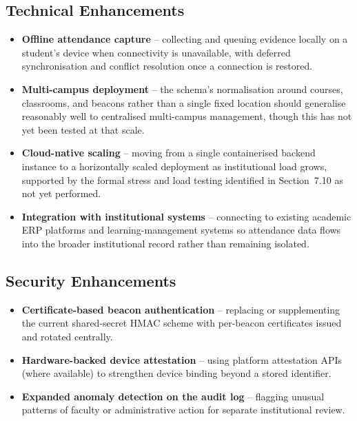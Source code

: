\documentclass[12pt, a4paper, oneside]{report}
\begin{document}
\subsection{Technical Enhancements}
\begin{itemize}
    \item \textbf{Offline attendance capture} -- collecting and queuing evidence locally on a student's device when connectivity is unavailable, with deferred synchronisation and conflict resolution once a connection is restored.
    \item \textbf{Multi-campus deployment} -- the schema's normalisation around courses, classrooms, and beacons rather than a single fixed location should generalise reasonably well to centralised multi-campus management, though this has not yet been tested at that scale.
    \item \textbf{Cloud-native scaling} -- moving from a single containerised backend instance to a horizontally scaled deployment as institutional load grows, supported by the formal stress and load testing identified in Section~7.10 as not yet performed.
    \item \textbf{Integration with institutional systems} -- connecting to existing academic ERP platforms and learning-management systems so attendance data flows into the broader institutional record rather than remaining isolated.
\end{itemize}

\subsection{Security Enhancements}
\begin{itemize}
    \item \textbf{Certificate-based beacon authentication} -- replacing or supplementing the current shared-secret HMAC scheme with per-beacon certificates issued and rotated centrally.
    \item \textbf{Hardware-backed device attestation} -- using platform attestation APIs (where available) to strengthen device binding beyond a stored identifier.
    \item \textbf{Expanded anomaly detection on the audit log} -- flagging unusual patterns of faculty or administrative action for separate institutional review.
\end{itemize}
\end{document}
